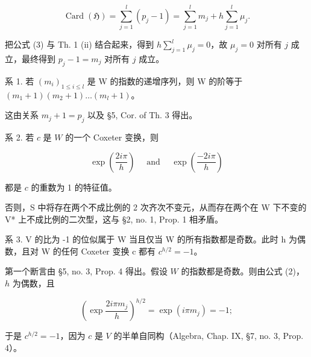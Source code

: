 \[
\operatorname{Card} (\mathfrak {H}) = \sum_ {j = 1} ^ {l} (p _ {j} - 1) = \sum_ {j = 1} ^ {l} m _ {j} + h \sum_ {j = 1} ^ {l} \mu_ {j}.
\]

把公式 (3) 与 Th. 1 (ii) 结合起来，得到 \(h \sum_{j=1}^{l} \mu_j = 0\)，故 \(\mu_j = 0\) 对所有 \(j\) 成立，最终得到 \(p_j - 1 = m_j\) 对所有 \(j\) 成立。

系 1. 若 \((m_i)_{1\leqslant i\leqslant l}\) 是 W 的指数的递增序列，则 W 的阶等于 \((m_1 + 1)(m_2 + 1)\ldots (m_l + 1)\)。

这由关系 \(m_j + 1 = p_j\) 以及 §5, Cor. of Th. 3 得出。

系 2. 若 \(c\) 是 \(W\) 的一个 Coxeter 变换，则

\[
\exp \left(\frac {2 i \pi}{h}\right) \quad \text { and } \quad \exp \left(\frac {- 2 i \pi}{h}\right)
\]

都是 \(c\) 的重数为 1 的特征值。

否则，S 中将存在两个不成比例的 2 次齐次不变元，从而存在两个在 W 下不变的 V* 上不成比例的二次型，这与 §2, no. 1, Prop. 1 相矛盾。

系 3. V 的比为 -1 的位似属于 W 当且仅当 W 的所有指数都是奇数。此时 h 为偶数，且对 W 的任何 Coxeter 变换 c 都有 \(c^{h/2} = -1\)。

第一个断言由 §5, no. 3, Prop. 4 得出。假设 \(W\) 的指数都是奇数。则由公式 (2)，\(h\) 为偶数，且

\[
\left(\exp \frac {2 i \pi m _ {j}}{h}\right) ^ {h / 2} = \exp (i \pi m _ {j}) = - 1;
\]

于是 \(c^{h/2} = -1\)，因为 \(c\) 是 \(V\) 的半单自同构（Algebra, Chap. IX, §7, no. 3, Prop. 4）。

